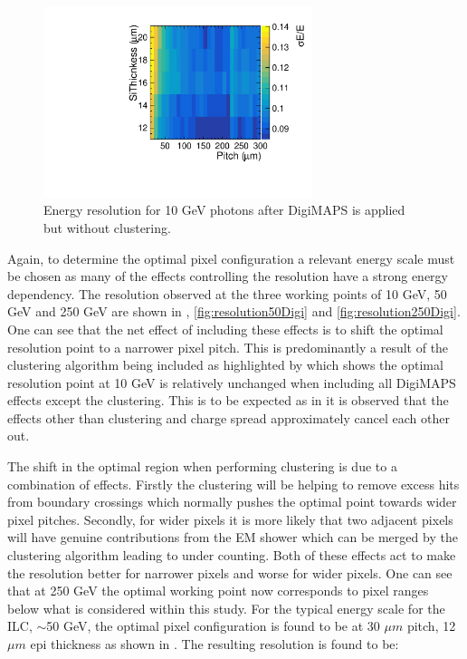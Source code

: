\begin{figure}
  \centering
  \includegraphics[width=0.7\textwidth,keepaspectratio]{DECALStudies/fig/NoClusterRes10.pdf}
  \caption{Energy resolution for 10 GeV photons after DigiMAPS is applied but without clustering.}
  \label{fig:resolution50DigiNoClust}
\end{figure}


Again, to determine the optimal pixel configuration a relevant energy scale must be chosen as many of the effects controlling the resolution have a strong energy dependency. The resolution observed at the three working points of 10 GeV, 50 GeV and 250 GeV are shown in , \ref{fig:resolution50Digi} and \ref{fig:resolution250Digi}. One can see that the net effect of including these effects is to shift the optimal resolution point to a narrower pixel pitch. This is predominantly a result of the clustering algorithm being included as highlighted by  which shows the optimal resolution point at 10 GeV is relatively unchanged when including all DigiMAPS effects except the clustering. This is to be expected as in  it is observed that the effects other than clustering and charge spread approximately cancel each other out.

The shift in the optimal region when performing clustering is due to a combination of effects. Firstly the clustering will be helping to remove excess hits from boundary crossings which normally pushes the optimal point towards wider pixel pitches. Secondly, for wider pixels it is more likely that two adjacent pixels will have genuine contributions from the EM shower which can be merged by the clustering algorithm leading to under counting. Both of these effects act to make the resolution better for narrower pixels and worse for wider pixels. One can see that at 250 GeV the optimal working point now corresponds to pixel ranges below what is considered within this study. For the typical energy scale for the \ac{ILC}, $\sim$50 GeV, the optimal pixel configuration is found to be at 30 $\mu m$ pitch, 12 $\mu m$ epi thickness as shown in . The resulting resolution is found to be:

